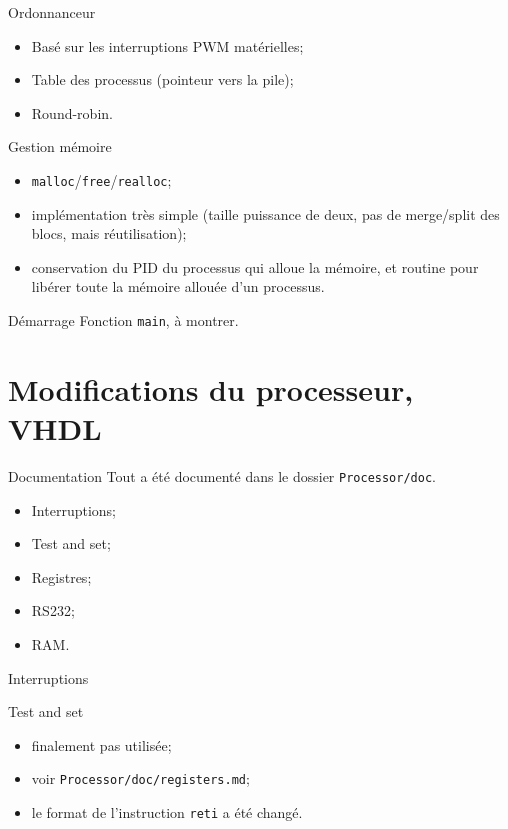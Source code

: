 \documentclass{beamer}
\begin{document}
    \begin{frame}[fragile]{Ordonnanceur}
      \begin{itemize}
        \item Basé sur les interruptions PWM matérielles;
        \item Table des processus (pointeur vers la pile);
        \item Round-robin.
      \end{itemize}
\end{frame}

    \begin{frame}[fragile]{Gestion mémoire}
      \begin{itemize}
        \item \verb+malloc+/\verb+free+/\verb+realloc+;
        \item implémentation très simple (taille puissance de deux, pas de
          merge/split des blocs, mais réutilisation);
        \item conservation du PID du processus qui alloue la mémoire, et routine
          pour libérer toute la mémoire allouée d'un processus.
      \end{itemize}
\end{frame}

    \begin{frame}[fragile]{Démarrage}
      Fonction \verb+main+, à montrer.
\end{frame}

  \section{Modifications du processeur, VHDL}
    \begin{frame}[fragile]{Documentation}
      Tout a été documenté dans le dossier \verb+Processor/doc+.
      \begin{itemize}
        \item Interruptions;
        \item Test and set;
        \item Registres;
        \item RS232;
        \item RAM.
      \end{itemize}
\end{frame}

    \begin{frame}{Interruptions}
    \end{frame}

    \begin{frame}[fragile]{Test and set}
      \begin{itemize}
        \item finalement pas utilisée;
        \item voir \verb+Processor/doc/registers.md+;
        \item le format de l'instruction \verb+reti+ a été changé.
      \end{itemize}
\end{frame}
\end{document}
